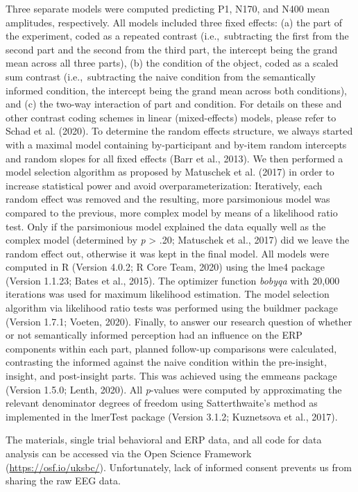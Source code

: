 \documentclass[
  english,
  man,floatsintext]{apa7}
\begin{document}
Three separate models were computed predicting P1, N170, and N400 mean amplitudes, respectively. All models included three fixed effects: (a) the part of the experiment, coded as a repeated contrast (i.e.,~subtracting the first from the second part and the second from the third part, the intercept being the grand mean across all three parts), (b) the condition of the object, coded as a scaled sum contrast (i.e.,~subtracting the naive condition from the semantically informed condition, the intercept being the grand mean across both conditions), and (c) the two-way interaction of part and condition. For details on these and other contrast coding schemes in linear (mixed-effects) models, please refer to Schad et al. (2020). To determine the random effects structure, we always started with a maximal model containing by-participant and by-item random intercepts and random slopes for all fixed effects (Barr et al., 2013). We then performed a model selection algorithm as proposed by Matuschek et al. (2017) in order to increase statistical power and avoid overparameterization: Iteratively, each random effect was removed and the resulting, more parsimonious model was compared to the previous, more complex model by means of a likelihood ratio test. Only if the parsimonious model explained the data equally well as the complex model (determined by \emph{p} \textgreater{} .20; Matuschek et al., 2017) did we leave the random effect out, otherwise it was kept in the final model. All models were computed in R (Version 4.0.2; R Core Team, 2020) using the lme4 package (Version 1.1.23; Bates et al., 2015). The optimizer function \emph{bobyqa} with 20,000 iterations was used for maximum likelihood estimation. The model selection algorithm via likelihood ratio tests was performed using the buildmer package (Version 1.7.1; Voeten, 2020). Finally, to answer our research question of whether or not semantically informed perception had an influence on the ERP components within each part, planned follow-up comparisons were calculated, contrasting the informed against the naive condition within the pre-insight, insight, and post-insight parts. This was achieved using the emmeans package (Version 1.5.0; Lenth, 2020). All \emph{p}-values were computed by approximating the relevant denominator degrees of freedom using Satterthwaite's method as implemented in the lmerTest package (Version 3.1.2; Kuznetsova et al., 2017).

The materials, single trial behavioral and ERP data, and all code for data analysis can be accessed via the Open Science Framework (\url{https://osf.io/uksbc/}). Unfortunately, lack of informed consent prevents us from sharing the raw EEG data.
\end{document}
